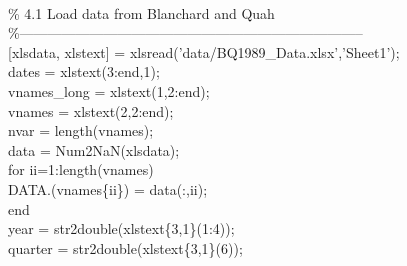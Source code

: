 \hspace{1mm}\hspace{5mm}  \\ 
\hspace{1mm}\hspace{5mm} \textcolor{matlabgreen}{\% 4.1 Load data from Blanchard and Quah }\\ 
\hspace{1mm}\hspace{5mm} \textcolor{matlabgreen}{\%--------------------------------------------------------------------------  }\\ 
\hspace{1mm}\hspace{5mm} [xlsdata, xlstext] = xlsread(\textcolor{matlabpurple}{'data/BQ1989\_Data.xlsx'},\textcolor{matlabpurple}{'Sheet1'}); \\ 
\hspace{1mm}\hspace{5mm} dates = xlstext(3:end,1); \\ 
\hspace{1mm}\hspace{5mm} vnames\_long = xlstext(1,2:end); \\ 
\hspace{1mm}\hspace{5mm} vnames = xlstext(2,2:end); \\ 
\hspace{1mm}\hspace{5mm} nvar = length(vnames); \\ 
\hspace{1mm}\hspace{5mm} data   = Num2NaN(xlsdata); \\ 
\hspace{1mm}\hspace{5mm} \textcolor{matlabblue}{for} ii=1:length(vnames) \\ 
\hspace{1mm}\hspace{5mm} \hspace{5mm} DATA.(vnames\{ii\}) = data(:,ii); \\ 
\hspace{1mm}\hspace{5mm} \textcolor{matlabblue}{end} \\ 
\hspace{1mm}\hspace{5mm} year = str2double(xlstext\{3,1\}(1:4)); \\ 
\hspace{1mm}\hspace{5mm} quarter = str2double(xlstext\{3,1\}(6)); \\ 
